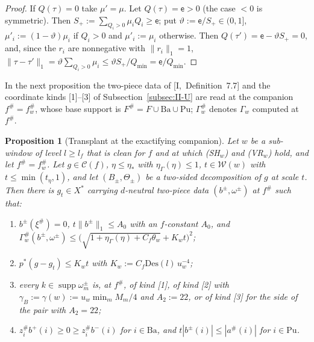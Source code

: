 \documentclass[10pt]{amsart}
\newtheorem{proposition}[theorem]{Proposition}
\theoremstyle{definition}
\theoremstyle{remark}
\newcommand{\supp}{\operatorname{supp}}
\newcommand{\Cset}{\mathcal C}
\begin{document}
\begin{proof}
If $Q(\tau)=0$ take $\mu'=\mu$.  Let $Q(\tau)=\mathsf e>0$ (the case $<0$ is
symmetric).  Then $S_+:=\sum_{Q_i>0}\mu_iQ_i\ge\mathsf e$; put $\vartheta:=
\mathsf e/S_+\in(0,1]$, $\mu'_i:=(1-\vartheta)\mu_i$ if $Q_i>0$ and $\mu'_i:=
\mu_i$ otherwise.  Then $Q(\tau')=\mathsf e-\vartheta S_+=0$, and, since the
$r_i$ are nonnegative with $\|r_i\|_1=1$, $\|\tau-\tau'\|_1=\vartheta
\sum_{Q_i>0}\mu_i\le\vartheta S_+/Q_{\min}=\mathsf e/Q_{\min}$.
\end{proof}

In the next proposition the two-piece data of [I,~Definition~7.7] and
the coordinate kinds [1]--[3] of Subsection~\ref{subsec:II-U} are read at
the companion $f^\#=f^\#_w$, whose base support is $F^\#=F\cup\mathrm{Ba}
\cup\mathrm{Pu}$; $\Gamma^\#_w$ denotes $\Gamma_w$ computed at $f^\#$.

\begin{proposition}[Transplant at the exactifying companion]
\label{prop:II-transplant}
Let $w$ be a sub-window of level $l\ge l_f$ that is clean for $f$ and at
which \textup{(SH$_w$)} and \textup{(VR$_w$)} hold, and let $f^\#=f^\#_w$.  Let
$g\in\Cset(f)$, $\eta\le\eta_*$ with $\eta_\Gamma(\eta)\le1$, $t\in\mathcal
W(w)$ with $t\le\min(t_\eta,1)$, and let $(B_\pm,\Theta_\pm)$ be a two-sided
decomposition of $g$ at scale $t$.  Then there is $g_t\in X^*$ carrying
$d$-neutral two-piece data $(b^\pm,\omega^\pm)$ at $f^\#$ such that:
\begin{enumerate}
\item[(i)] $b^\pm(\xi^\#)=0$, $t\|b^\pm\|_1\le A_0$ with an $f$-constant $A_0$,
and $\Gamma^\#_w(b^\pm,\omega^\pm)\le\big(\sqrt{1+\eta_\Gamma(\eta)+C_f
\theta_w}+K_wt\big)^2$;
\item[(ii)] $p^*(g-g_t)\le K_wt$ with $K_w:=C_f\mathrm{Des}(l)\,u_w^{-4}$;
\item[(iii)] every $k\in\supp\omega^\pm_m$ is, at $f^\#$, of kind
\textup{[1]}, of kind \textup{[2]} with $\gamma_B:=\gamma(w):=u_w\min_mM_m/4$
and $A_2:=22$, or of kind \textup{[3]} for the side of the pair with
$A_2=22$;
\item[(iv)] $z^\#_ib^+(i)\ge0\ge z^\#_ib^-(i)$ for $i\in\mathrm{Ba}$, and
$t|b^\pm(i)|\le|a^\#(i)|$ for $i\in\mathrm{Pu}$.
\end{enumerate}
\end{proposition}
\end{document}
